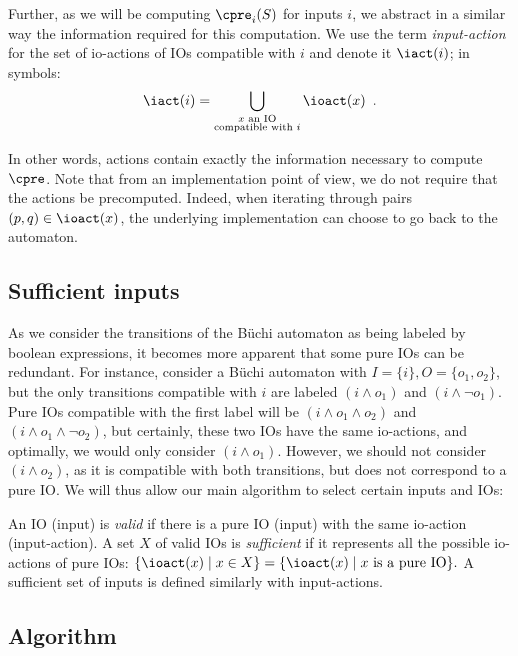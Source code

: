 \documentclass[runningheads,a4paper]{llncs}
\begin{document}
Further, as we will be computing \(\cpre_i(S)\) for inputs \(i\), we abstract in a
similar way the information required for this computation.  We use the term
\emph{input-action} for the set of io-actions of IOs compatible with \(i\) and denote
it \(\iact(i)\); in symbols:
\[\iact(i) = \bigcup_{\substack{x \text{ an IO}\\\text{compatible with }i}} \ioact(x) \enspace.\]

In other words, actions contain exactly the information necessary to compute
\(\cpre\).  Note that from an implementation point of view, we do not require that
the actions be precomputed.  Indeed, when iterating through pairs
\((p, q) \in \ioact(x)\), the underlying implementation can choose to go back to the
automaton.

\subsection{Sufficient inputs}\label{sec:sufficient}

As we consider the transitions of the Büchi automaton as being labeled by
boolean expressions, it becomes more apparent that some pure IOs can be
redundant.  For instance, consider a Büchi automaton with
\(I = \{i\}, O = \{o_1, o_2\}\), but the only transitions compatible with \(i\) are
labeled \((i \land o_1)\) and \((i \land \neg o_1)\).  Pure IOs compatible with the first
label will be \((i \land o_1 \land o_2)\) and \((i \land o_1 \land \neg o_2)\), but
certainly, these two IOs have the same io-actions, and optimally, we would only
consider \((i \land o_1)\).  However, we should not consider \((i \land o_2)\), as it is
compatible with both transitions, but does not correspond to a pure IO.  We will
thus allow our main algorithm to select certain inputs and IOs:
\begin{definition}
  An IO (\resp input) is \emph{valid} if there is a pure IO (\resp input) with
  the same io-action (\resp input-action).  A set \(X\) of valid IOs is
  \emph{sufficient} if it represents all the possible io-actions of pure IOs:
  \(\{\ioact(x) \mid x \in X\} = \{\ioact(x) \mid x \text{ is a pure IO}\}.\)
  A sufficient set of inputs is defined similarly with input-actions.
\end{definition}

\subsection{Algorithm}\label{sec:algo}
\end{document}
